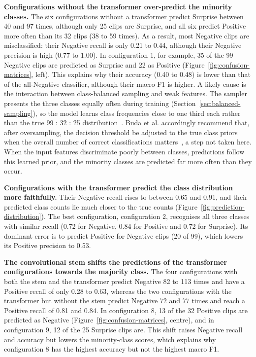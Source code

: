 \textbf{Configurations without the transformer over-predict the minority classes.} The six configurations without a transformer predict Surprise between 40 and 97 times, although only 25 clips are Surprise, and all six predict Positive more often than its 32 clips (38 to 59 times). As a result, most Negative clips are misclassified: their Negative recall is only 0.21 to 0.44, although their Negative precision is high (0.77 to 1.00). In configuration 1, for example, 35 of the 99 Negative clips are predicted as Surprise and 22 as Positive (Figure~\ref{fig:confusion-matrices}, left). This explains why their accuracy (0.40 to 0.48) is lower than that of the all-Negative classifier, although their macro F1 is higher. A likely cause is the interaction between class-balanced sampling and weak features. The sampler presents the three classes equally often during training (Section~\ref{sec:balanced-sampling}), so the model learns class frequencies close to one third each rather than the true 99 : 32 : 25 distribution~\cite{he2009}. Buda et al. accordingly recommend that, after oversampling, the decision threshold be adjusted to the true class priors when the overall number of correct classifications matters~\cite{buda2018}, a step not taken here. When the input features discriminate poorly between classes, predictions follow this learned prior, and the minority classes are predicted far more often than they occur.

\textbf{Configurations with the transformer predict the class distribution more faithfully.} Their Negative recall rises to between 0.65 and 0.91, and their predicted class counts lie much closer to the true counts (Figure~\ref{fig:prediction-distribution}). The best configuration, configuration 2, recognises all three classes with similar recall (0.72 for Negative, 0.84 for Positive and 0.72 for Surprise). Its dominant error is to predict Positive for Negative clips (20 of 99), which lowers its Positive precision to 0.53.

\textbf{The convolutional stem shifts the predictions of the transformer configurations towards the majority class.} The four configurations with both the stem and the transformer predict Negative 82 to 113 times and have a Positive recall of only 0.28 to 0.63, whereas the two configurations with the transformer but without the stem predict Negative 72 and 77 times and reach a Positive recall of 0.81 and 0.84. In configuration 8, 13 of the 32 Positive clips are predicted as Negative (Figure~\ref{fig:confusion-matrices}, centre), and in configuration 9, 12 of the 25 Surprise clips are. This shift raises Negative recall and accuracy but lowers the minority-class scores, which explains why configuration 8 has the highest accuracy but not the highest macro F1.

